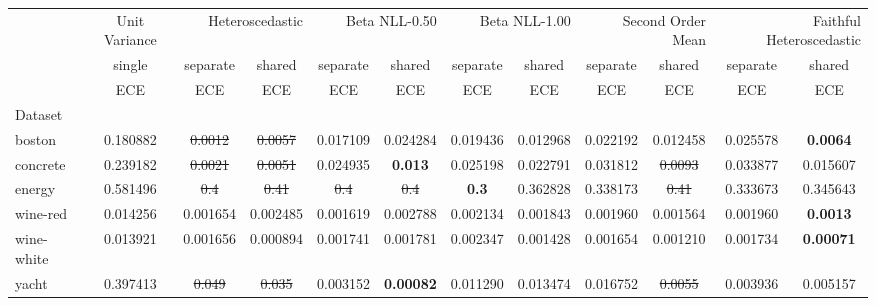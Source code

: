 \begin{tabular}{l|c|cc|cc|cc|cc|cc}
\toprule
{} & {Unit Variance} & \multicolumn{2}{r}{Heteroscedastic} & \multicolumn{2}{r}{Beta NLL-0.50} & \multicolumn{2}{r}{Beta NLL-1.00} & \multicolumn{2}{r}{Second Order Mean} & \multicolumn{2}{r}{Faithful Heteroscedastic} \\
{} & {single} & {separate} & {shared} & {separate} & {shared} & {separate} & {shared} & {separate} & {shared} & {separate} & {shared} \\
{} & {ECE} & {ECE} & {ECE} & {ECE} & {ECE} & {ECE} & {ECE} & {ECE} & {ECE} & {ECE} & {ECE} \\
{Dataset} & {} & {} & {} & {} & {} & {} & {} & {} & {} & {} & {} \\
\midrule
boston & 0.180882 & \sout{0.0012} & \sout{0.0057} & 0.017109 & 0.024284 & 0.019436 & 0.012968 & 0.022192 & 0.012458 & 0.025578 & \textbf{0.0064} \\
concrete & 0.239182 & \sout{0.0021} & \sout{0.0051} & 0.024935 & \textbf{0.013} & 0.025198 & 0.022791 & 0.031812 & \sout{0.0093} & 0.033877 & 0.015607 \\
energy & 0.581496 & \sout{0.4} & \sout{0.41} & \sout{0.4} & \sout{0.4} & \textbf{0.3} & 0.362828 & 0.338173 & \sout{0.41} & 0.333673 & 0.345643 \\
wine-red & 0.014256 & 0.001654 & 0.002485 & 0.001619 & 0.002788 & 0.002134 & 0.001843 & 0.001960 & 0.001564 & 0.001960 & \textbf{0.0013} \\
wine-white & 0.013921 & 0.001656 & 0.000894 & 0.001741 & 0.001781 & 0.002347 & 0.001428 & 0.001654 & 0.001210 & 0.001734 & \textbf{0.00071} \\
yacht & 0.397413 & \sout{0.049} & \sout{0.035} & 0.003152 & \textbf{0.00082} & 0.011290 & 0.013474 & 0.016752 & \sout{0.0055} & 0.003936 & 0.005157 \\
\bottomrule
\end{tabular}
